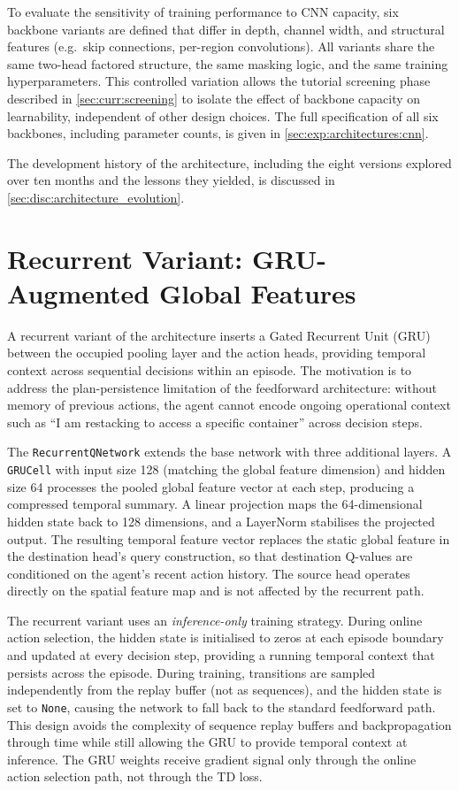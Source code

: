 To evaluate the sensitivity of training performance to CNN capacity, six backbone variants are defined that differ in depth, channel width, and structural features (e.g.\ skip connections, per-region convolutions). All variants share the same two-head factored structure, the same masking logic, and the same training hyperparameters. This controlled variation allows the tutorial screening phase described in \cref{sec:curr:screening} to isolate the effect of backbone capacity on learnability, independent of other design choices. The full specification of all six backbones, including parameter counts, is given in \cref{sec:exp:architectures:cnn}.

The development history of the architecture, including the eight versions explored over ten months and the lessons they yielded, is discussed in \cref{sec:disc:architecture_evolution}.

\section{Recurrent Variant: GRU-Augmented Global Features}
\label{sec:agent:gru}

A recurrent variant of the architecture inserts a Gated Recurrent Unit (GRU) \cite{cho2014gru} between the occupied pooling layer and the action heads, providing temporal context across sequential decisions within an episode. The motivation is to address the plan-persistence limitation of the feedforward architecture: without memory of previous actions, the agent cannot encode ongoing operational context such as ``I am restacking to access a specific container'' across decision steps.

The \texttt{RecurrentQNetwork} extends the base network with three additional layers. A \texttt{GRUCell} with input size 128 (matching the global feature dimension) and hidden size 64 processes the pooled global feature vector at each step, producing a compressed temporal summary. A linear projection maps the 64-dimensional hidden state back to 128 dimensions, and a LayerNorm stabilises the projected output. The resulting temporal feature vector replaces the static global feature in the destination head's query construction, so that destination Q-values are conditioned on the agent's recent action history. The source head operates directly on the spatial feature map and is not affected by the recurrent path.

The recurrent variant uses an \emph{inference-only} training strategy. During online action selection, the hidden state is initialised to zeros at each episode boundary and updated at every decision step, providing a running temporal context that persists across the episode. During training, transitions are sampled independently from the replay buffer (not as sequences), and the hidden state is set to \texttt{None}, causing the network to fall back to the standard feedforward path. This design avoids the complexity of sequence replay buffers and backpropagation through time while still allowing the GRU to provide temporal context at inference. The GRU weights receive gradient signal only through the online action selection path, not through the TD loss.

